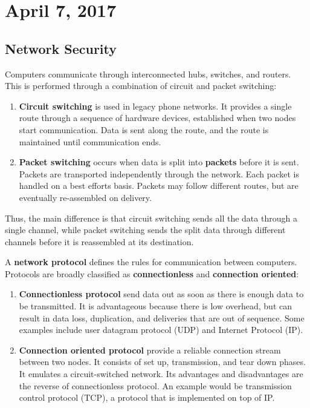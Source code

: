 \documentclass[11pt]{article}
\theoremstyle{plain} %
\theoremstyle{definition}
\theoremstyle{example}
\theoremstyle{remark}
\begin{document}
\section{April 7, 2017}
\subsection{Network Security}

Computers communicate through interconnected hubs, switches, and routers. This is performed through a combination of circuit and packet switching:
\begin{enumerate}
	\item \textbf{Circuit switching} is used in legacy phone networks. It provides a single route through a sequence of hardware devices, established when two nodes start communication. Data is sent along the route, and the route is maintained until communication ends. 
	\item \textbf{Packet switching} occurs when data is split into \textbf{packets} before it is sent. Packets are transported independently through the network. Each packet is handled on a best efforts basis. Packets may follow different routes, but are eventually re-assembled on delivery. 
\end{enumerate}
Thus, the main difference is that circuit switching sends all the data through a single channel, while packet switching sends the split data through different channels before it is reassembled at its destination. 

A \textbf{network protocol} defines the rules for communication between computers. Protocols are broadly classified as \textbf{connectionless} and \textbf{connection oriented}:
\begin{enumerate}
	\item \textbf{Connectionless protocol} send data out as soon as there is enough data to be transmitted. It is advantageous because there is low overhead, but can result in data loss, duplication, and deliveries that are out of sequence. Some examples include user datagram protocol (UDP) and Internet Protocol (IP). 
	\item \textbf{Connection oriented protocol} provide a reliable connection stream between two nodes. It consists of set up, transmission, and tear down phases. It emulates a circuit-switched network. Its advantages and disadvantages are the reverse of connectionless protocol. An example would be transmission control protocol (TCP), a protocol that is implemented on top of IP. 
\end{enumerate}
\end{document}
